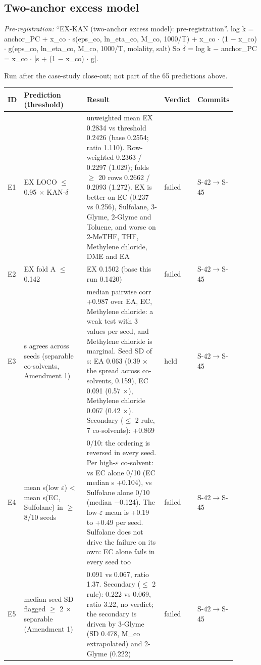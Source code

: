 \subsection{Two-anchor excess model}
\noindent\textit{Pre-registration:} ``EX-KAN (two-anchor excess model): pre-registration''. log k = anchor\_PC + x\_co $\cdot$ s(eps\_co, ln\_eta\_co, M\_co, 1000/T) + x\_co $\cdot$ (1 $-$ x\_co) $\cdot$ g(eps\_co, ln\_eta\_co, M\_co, 1000/T, molality, salt) So $\delta$ = log k $-$ anchor\_PC = x\_co $\cdot$ [s + (1 $-$ x\_co) $\cdot$ g].

Run after the case-study close-out; not part of the 65 predictions above.

{\footnotesize\setlength{\tabcolsep}{3pt}
\begin{longtable}{R{0.07\linewidth} R{0.28\linewidth} R{0.35\linewidth} R{0.09\linewidth} R{0.11\linewidth}}
\toprule
ID & Prediction (threshold) & Result & Verdict & Commits \\
\midrule
\endhead
E1 & EX LOCO $\leq$ 0.95 $\times$ KAN-$\delta$ & unweighted mean EX 0.2834 vs threshold 0.2426 (base 0.2554; ratio 1.110). Row-weighted 0.2363 / 0.2297 (1.029); folds $\geq$ 20 rows 0.2662 / 0.2093 (1.272). EX is better on EC (0.237 vs 0.256), Sulfolane, 3-Glyme, 2-Glyme and Toluene, and worse on 2-MeTHF, THF, Methylene chloride, DME and EA & failed & S-42$\to$\allowbreak S-45 \\
E2 & EX fold A $\leq$ 0.142 & EX 0.1502 (base this run 0.1420) & failed & S-42$\to$\allowbreak S-45 \\
E3 & s agrees across seeds (separable co-solvents, Amendment 1) & median pairwise corr +0.987 over EA, EC, Methylene chloride: a weak test with 3 values per seed, and Methylene chloride is marginal. Seed SD of s: EA 0.063 (0.39 $\times$ the spread across co-solvents, 0.159), EC 0.091 (0.57 $\times$), Methylene chloride 0.067 (0.42 $\times$). Secondary ($\leq$ 2 rule, 7 co-solvents): +0.869 & held & S-42$\to$\allowbreak S-45 \\
E4 & mean s(low $\varepsilon$) < mean s(EC, Sulfolane) in $\geq$ 8/10 seeds & 0/10: the ordering is reversed in every seed. Per high-$\varepsilon$ co-solvent: vs EC alone 0/10 (EC median s +0.104), vs Sulfolane alone 0/10 (median $-$0.124). The low-$\varepsilon$ mean is +0.19 to +0.49 per seed. Sulfolane does not drive the failure on its own: EC alone fails in every seed too & failed & S-42$\to$\allowbreak S-45 \\
E5 & median seed-SD flagged $\geq$ 2 $\times$ separable (Amendment 1) & 0.091 vs 0.067, ratio 1.37. Secondary ($\leq$ 2 rule): 0.222 vs 0.069, ratio 3.22, no verdict; the secondary is driven by 3-Glyme (SD 0.478, M\_co extrapolated) and 2-Glyme (0.222) & failed & S-42$\to$\allowbreak S-45 \\
\bottomrule
\end{longtable}}
